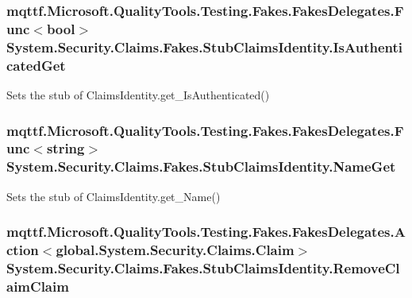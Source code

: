 \hypertarget{class_system_1_1_security_1_1_claims_1_1_fakes_1_1_stub_claims_identity_a58937e27cae2f39360373726634d96bd}{
\subsubsection[{Is\-Authenticated\-Get}]{\setlength{\rightskip}{0pt plus 5cm}mqttf.\-Microsoft.\-Quality\-Tools.\-Testing.\-Fakes.\-Fakes\-Delegates.\-Func$<$bool$>$ System.\-Security.\-Claims.\-Fakes.\-Stub\-Claims\-Identity.\-Is\-Authenticated\-Get}}\label{class_system_1_1_security_1_1_claims_1_1_fakes_1_1_stub_claims_identity_a58937e27cae2f39360373726634d96bd}


Sets the stub of Claims\-Identity.\-get\-\_\-\-Is\-Authenticated()

\hypertarget{class_system_1_1_security_1_1_claims_1_1_fakes_1_1_stub_claims_identity_a21f99321ca84c5b5f0344e1d70daa06d}{
\subsubsection[{Name\-Get}]{\setlength{\rightskip}{0pt plus 5cm}mqttf.\-Microsoft.\-Quality\-Tools.\-Testing.\-Fakes.\-Fakes\-Delegates.\-Func$<$string$>$ System.\-Security.\-Claims.\-Fakes.\-Stub\-Claims\-Identity.\-Name\-Get}}\label{class_system_1_1_security_1_1_claims_1_1_fakes_1_1_stub_claims_identity_a21f99321ca84c5b5f0344e1d70daa06d}


Sets the stub of Claims\-Identity.\-get\-\_\-\-Name()

\hypertarget{class_system_1_1_security_1_1_claims_1_1_fakes_1_1_stub_claims_identity_acd36c591c9dab643b11acc1fb63a430a}{
\subsubsection[{Remove\-Claim\-Claim}]{\setlength{\rightskip}{0pt plus 5cm}mqttf.\-Microsoft.\-Quality\-Tools.\-Testing.\-Fakes.\-Fakes\-Delegates.\-Action$<$global.\-System.\-Security.\-Claims.\-Claim$>$ System.\-Security.\-Claims.\-Fakes.\-Stub\-Claims\-Identity.\-Remove\-Claim\-Claim}}\label{class_system_1_1_security_1_1_claims_1_1_fakes_1_1_stub_claims_identity_acd36c591c9dab643b11acc1fb63a430a}


